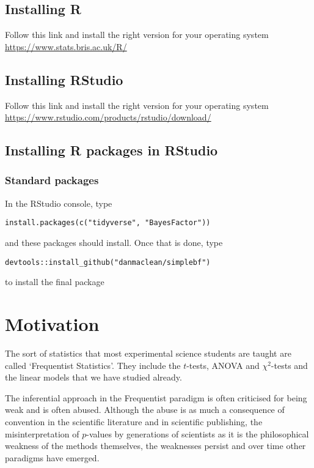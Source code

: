 \documentclass[
]{book}
\begin{document}
\hypertarget{installing-r}{%
\section{Installing R}\label{installing-r}}

Follow this link and install the right version for your operating system \url{https://www.stats.bris.ac.uk/R/}

\hypertarget{installing-rstudio}{%
\section{Installing RStudio}\label{installing-rstudio}}

Follow this link and install the right version for your operating system \url{https://www.rstudio.com/products/rstudio/download/}

\hypertarget{installing-r-packages-in-rstudio}{%
\section{Installing R packages in RStudio}\label{installing-r-packages-in-rstudio}}

\hypertarget{standard-packages}{%
\subsection{Standard packages}\label{standard-packages}}

In the RStudio console, type

\texttt{install.packages(c("tidyverse",\ "BayesFactor"))}

and these packages should install. Once that is done, type

\texttt{devtools::install\_github("danmaclean/simplebf")}

to install the final package

\hypertarget{motivation}{%
\chapter{Motivation}\label{motivation}}

The sort of statistics that most experimental science students are taught are called `Frequentist Statistics'. They include the \(t\)-tests, ANOVA and \(\chi^2\)-tests and the linear models that we have studied already.

The inferential approach in the Frequentist paradigm is often criticised for being weak and is often abused. Although the abuse is as much a consequence of convention in the scientific literature and in scientific publishing, the misinterpretation of \(p\)-values by generations of scientists as it is the philosophical weakness of the methods themselves, the weaknesses persist and over time other paradigms have emerged.
\end{document}
